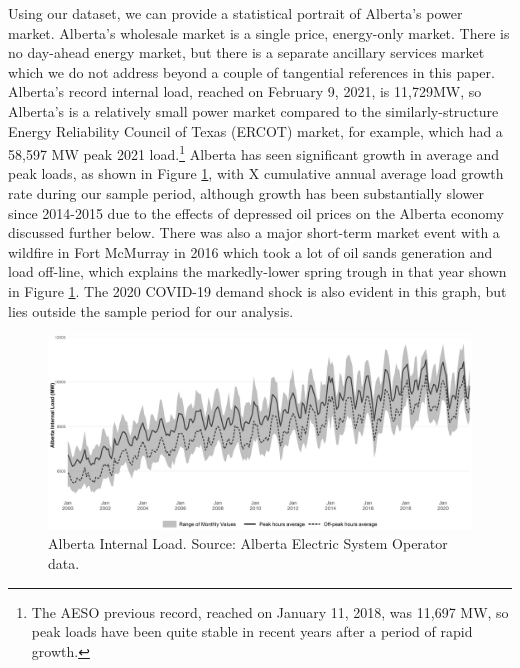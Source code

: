 \documentclass[12pt]{article}
\begin{document}
Using our dataset, we can provide a statistical portrait of Alberta's power market. Alberta's wholesale market is a single price, energy-only market. There is no day-ahead energy market, but there is a separate ancillary services market which we do not address beyond a couple of tangential references in this paper.  Alberta's record internal load, reached on February 9, 2021, is 11,729MW, so Alberta's is a relatively small power market compared to the similarly-structure Energy Reliability Council of Texas (ERCOT) market, for example, which had a 58,597 MW peak 2021 load.\footnote{The AESO previous record, reached on January 11, 2018, was 11,697 MW, so peak loads have been quite stable in recent years after a period of rapid growth.} Alberta has seen significant growth in average and peak loads, as shown in Figure \ref{fig:ab_load}, with X cumulative annual average load growth rate during our sample period, although growth has been substantially slower since 2014-2015 due to the effects of depressed oil prices on the Alberta economy discussed further below. There was also a major short-term market event with a wildfire in Fort McMurray in 2016 which took a lot of oil sands generation and load off-line, which explains the markedly-lower spring trough in that year shown in Figure \ref{fig:ab_load}. The 2020 COVID-19 demand shock is also evident in this graph, but lies outside the sample period for our analysis.

\begin{figure}[t]%
	\centering \vspace{-.25cm} \includegraphics[width=6.5in]{../images/loads_clean.png}
\vspace{-0.75cm}	\caption{Alberta Internal Load. Source: Alberta Electric System Operator data.}
\label{fig:ab_load}
\end{figure}
\end{document}
